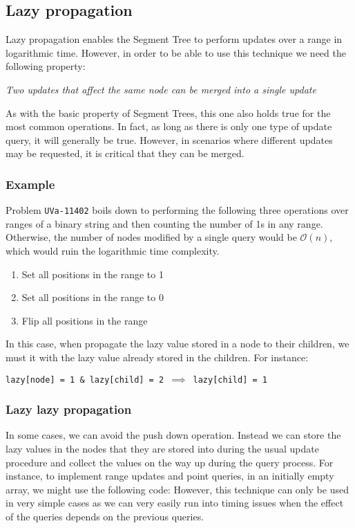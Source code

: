 \newpage
\subsection{Lazy propagation}
Lazy propagation enables the Segment Tree to perform updates over a range 
in logarithmic time. However, in order to be able to use this technique we
need the following property:
\begin{center}
\itshape
Two updates that affect the same node can be merged into a single update 
\end{center}
As with the basic property of Segment Trees, this one also holds true for
the most common operations. In fact, as long as there is only one type of
update query, it will generally be true.
However, in scenarios where different updates may be requested, it is critical
that they can be merged. 
\subsubsection*{Example}
Problem \texttt{UVa-11402} boils down to performing the following three
operations over ranges of a binary string and then counting the number 
of 1s in any range.  Otherwise, the number of nodes modified by a single
query would be $\mathcal{O}(n)$, which would ruin the logarithmic time
complexity.
\begin{enumerate}
		\setlength{\itemsep}{0pt}
		\item Set all positions in the range to 1
		\item Set all positions in the range to 0
		\item Flip all positions in the range 
\end{enumerate}
In this case, when propagate the lazy value stored in a node to their 
children, we must  it with the lazy value already stored
in the children. For instance:
\begin{center}
\texttt{lazy[node] = 1 \& lazy[child] = 2 $\implies$ 
lazy[child] = 1} 
\end{center}
\subsubsection*{Lazy lazy propagation}
In some cases, we can avoid the push down operation. Instead
we can store the lazy values in the nodes that they are
stored into during the usual update procedure and collect
the values on the way up during the query process. For instance,
to implement range updates and point queries, in an initially
empty array, we might use the following code:
However, this technique can only be used in very simple cases
as we can very easily run into timing issues when the 
effect of the queries depends on the previous queries.

